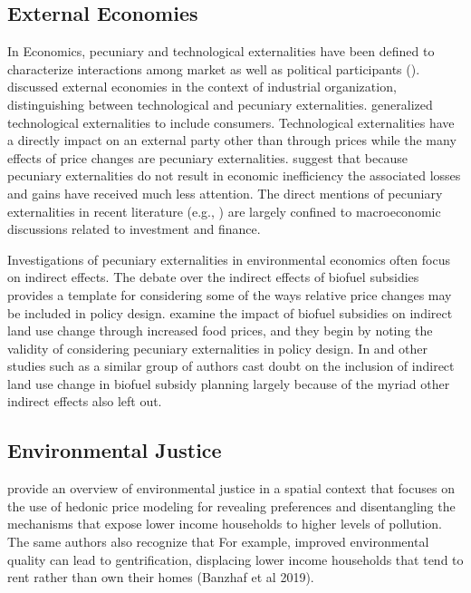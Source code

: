 \documentclass[ecta,nameyear,draft]{econsocart}
\theoremstyle{plain}
\theoremstyle{remark}
\begin{document}
\subsection{External Economies} 

In Economics, pecuniary and technological externalities have been defined to characterize interactions among market as well as political participants (\cite{holcombe01}). \cite{scitovsky54} discussed external economies in the context of industrial organization, distinguishing between technological and pecuniary externalities. \cite{buchananstubblebine} generalized technological externalities to include consumers. Technological externalities have a directly impact on an external party other than through prices while the many effects of price changes are pecuniary externalities. \cite{holcombe01} suggest that because pecuniary externalities do not result in economic inefficiency the associated losses and gains have received much less attention. The direct mentions of pecuniary externalities in recent literature (e.g., \cite{davila18}) are largely confined to macroeconomic discussions related to investment and finance. 

Investigations of pecuniary externalities in environmental economics often focus on indirect effects. The debate over the indirect effects of biofuel subsidies provides a template for considering some of the ways relative price changes may be included in policy design. \cite{zilberman11} examine the impact of biofuel subsidies on indirect land use change through increased food prices, and they begin by noting the validity of considering pecuniary externalities in policy design. In \cite{zilberman11} and other studies such as \cite{zilberman13} a similar group of authors cast doubt on the inclusion of indirect land use change in biofuel subsidy planning largely because of the myriad other indirect effects also left out.



\subsection{Environmental Justice} 
\cite{banzhafJustice19} provide an overview of environmental justice in a spatial context that focuses on the use of hedonic price modeling for revealing preferences and disentangling the mechanisms that expose lower income households to higher levels of pollution. The same authors also recognize that For example, improved environmental quality can lead to gentrification, displacing lower income households that tend to rent rather than own their homes (Banzhaf et al 2019). 
 
\end{document}
